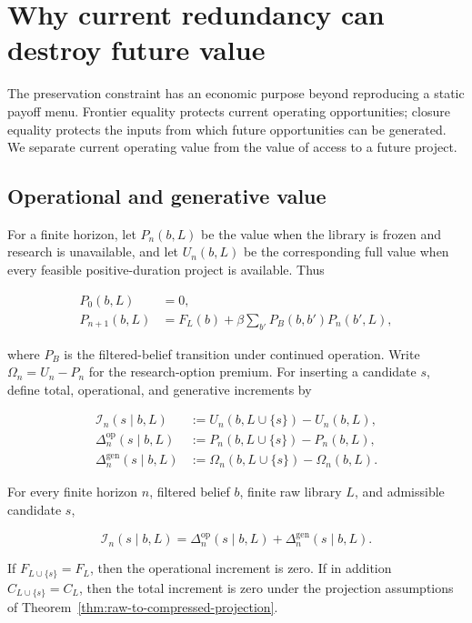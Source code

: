 \section{Why current redundancy can destroy future value}
\label{sec:economic-implications}
\label{sec:value}

The preservation constraint has an economic purpose beyond reproducing a
static payoff menu. Frontier equality protects current operating
opportunities; closure equality protects the inputs from which future
opportunities can be generated. We separate current operating value from the value of access to a future project.

\subsection{Operational and generative value}

For a finite horizon, let \(P_n(b,L)\) be the value when the library is frozen
and research is unavailable, and let \(U_n(b,L)\) be the corresponding full
value when every feasible positive-duration project is available. Thus

\begin{align}
 P_0(b,L)&=0,\nonumber\\
 P_{n+1}(b,L)&=F_L(b)+\beta
   \sum_{b'}P_B(b,b')P_n(b',L),
 \label{eq:passive-value}
\end{align}

where \(P_B\) is the filtered-belief transition under continued operation.
Write \(\Omega_n=U_n-P_n\) for the research-option premium. For inserting a
candidate \(s\), define total, operational, and generative increments by

\begin{align}
 \mathcal I_n(s\mid b,L)
   &:=U_n(b,L\cup\{s\})-U_n(b,L),\nonumber\\
 \Delta_n^{\mathrm{op}}(s\mid b,L)
   &:=P_n(b,L\cup\{s\})-P_n(b,L),\nonumber\\
 \Delta_n^{\mathrm{gen}}(s\mid b,L)
   &:=\Omega_n(b,L\cup\{s\})-\Omega_n(b,L).
 \label{eq:value-channels}
\end{align}

\begin{proposition}
\label{thm:value-decomposition}
For every finite horizon \(n\), filtered belief \(b\), finite raw library
\(L\), and admissible candidate \(s\),

\begin{equation}
 \mathcal I_n(s\mid b,L)
 =\Delta_n^{\mathrm{op}}(s\mid b,L)
  +\Delta_n^{\mathrm{gen}}(s\mid b,L).
 \label{eq:value-decomposition}
\end{equation}

If \(F_{L\cup\{s\}}=F_L\), then the operational increment is zero. If in
addition \(C_{L\cup\{s\}}=C_L\), then the total increment is zero under the
projection assumptions of Theorem~\ref{thm:raw-to-compressed-projection}.
\end{proposition}

